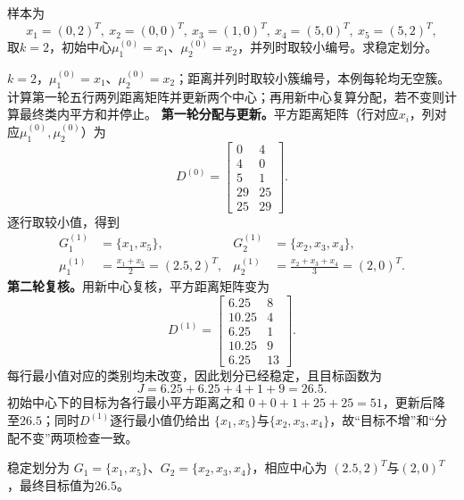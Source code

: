 \label{struct:V4-C02-CH18}
\label{struct:V4-C02-CH32}
\begin{example}\label{exm:V4-C02-five-points}
样本为
\[
x_1=(0,2)^T,\ x_2=(0,0)^T,\ x_3=(1,0)^T,\ x_4=(5,0)^T,\ x_5=(5,2)^T,
\]
取$k=2$，初始中心$\mu_1^{(0)}=x_1$、$\mu_2^{(0)}=x_2$，并列时取较小编号。求稳定划分。

\label{struct:V4-C02-CH33}
\end{example}
\begin{solution}
\SolGiven $k=2$，$\mu_1^{(0)}=x_1$、$\mu_2^{(0)}=x_2$；距离并列时取较小簇编号，本例每轮均无空簇。
\SolPlan 计算第一轮五行两列距离矩阵并更新两个中心；再用新中心复算分配，若不变则计算最终类内平方和并停止。
\SolDerive
\textbf{第一轮分配与更新。}平方距离矩阵（行对应$x_i$，列对应$\mu_1^{(0)},\mu_2^{(0)}$）为
\[
D^{(0)}=
\begin{bmatrix}
0&4\\
4&0\\
5&1\\
29&25\\
25&29
\end{bmatrix}.
\]
逐行取较小值，得到
\[
\begin{aligned}
G_1^{(1)}&=\{x_1,x_5\},&
G_2^{(1)}&=\{x_2,x_3,x_4\},\\
\mu_1^{(1)}&=\frac{x_1+x_5}{2}=(2.5,2)^T,&
\mu_2^{(1)}&=\frac{x_2+x_3+x_4}{3}=(2,0)^T.
\end{aligned}
\]
\textbf{第二轮复核。}用新中心复核，平方距离矩阵变为
\[
D^{(1)}=
\begin{bmatrix}
6.25&8\\
10.25&4\\
6.25&1\\
10.25&9\\
6.25&13
\end{bmatrix}.
\]
每行最小值对应的类别均未改变，因此划分已经稳定，且目标函数为
\[
J=6.25+6.25+4+1+9=26.5.
\]
\SolCheck 初始中心下的目标为各行最小平方距离之和
$0+0+1+25+25=51$，更新后降至$26.5$；同时$D^{(1)}$逐行最小值仍给出
$\{x_1,x_5\}$与$\{x_2,x_3,x_4\}$，故“目标不增”和“分配不变”两项检查一致。

\SolAnswer 稳定划分为
$G_1=\{x_1,x_5\}$、$G_2=\{x_2,x_3,x_4\}$，相应中心为
$(2.5,2)^T$与$(2,0)^T$，最终目标值为$26.5$。
\end{solution}

